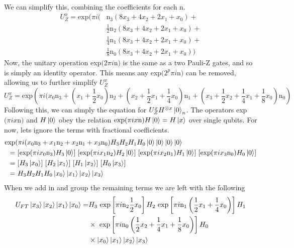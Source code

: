 \documentclass[a4paper,10pt, titlepage, twoside]{article}
\begin{document}
We can simplify this, combining the coefficients for each n.
\begin{align*}
U_Z^x = \text{exp} (\pi i (&\text{n}_3 (8x_3 + 4x_2 + 2x_1 + x_0) +\\
&\frac{1}{2}\text{n}_2 (8x_3 + 4x_2 + 2x_1 + x_0) + \\
&\frac{1}{4}\text{n}_1 (8x_3 + 4x_2 + 2x_1 + x_0) + \\
&\frac{1}{8}\text{n}_0 (8x_3 + 4x_2 + 2x_1 + x_0))
\end{align*}
Now, the unitary operation exp$(2\pi i$n$)$ is the same as a two Pauli-Z gates, and so is simply an identity operator. This means any exp$(2^p\pi i$n$)$ can be removed, allowing us to further simplify $U_Z^x$
$$U_Z^x = \text{exp} \left(\pi i (x_0\text{n}_3 + (x_1 + \frac{1}{2}x_0)\text{n}_2 + (x_2 + \frac{1}{2}x_1 + \frac{1}{4}x_0)\text{n}_1 + (x_3 + \frac{1}{2}x_2 + \frac{1}{4}x_1 + \frac{1}{8}x_0)\text{n}_0\right)$$
Following this, we can simply the equation for $U_Z ^x H^{\otimes x} \ket 0 _n$. The operators exp$(\pi i x$n$)$ and $H\ket 0$ obey the relation $\text{exp}(\pi i x \text{n}) H\ket 0 = H\ket x$ over single qubits.
For now, lets ignore the terms with fractional coefficients.
\begin{align*}
\text{exp}& (\pi i (x_0\text{n}_3 + x_1\text{n}_2 + x_2\text{n}_1 + x_3 \text{n}_0)H_3 H_2 H_1 H_0 \ket 0 \ket 0 \ket 0 \ket 0 \\
= &\text{  }[\text{exp}(\pi i x_0 \text{n}_3)H_3\ket 0 ]\text{  }[\text{exp}(\pi i x_1 \text{n}_2)H_2\ket 0 ]\text{  }[\text{exp}(\pi i x_2 \text{n}_1)H_1\ket 0 ]\text{  }[\text{exp}(\pi i x_3 \text{n}_0)H_0\ket 0 ] \\
= &\text{  }[H_3 \ket{x_0}]\text{  }[ H_2 \ket{x_1}]\text{  }[ H_1 \ket{x_2}]\text{  }[ H_0 \ket{x_3}]\\
= & \text{  }H_3 H_2 H_1 H_0 \ket{x_0} \ket{x_1} \ket{x_2} \ket{x_3}
\end{align*}
When we add in and group the remaining terms we are left with the following
\begin{align*}
U_{FT} \ket{x_3} \ket{x_2} \ket{x_1} \ket{x_0} = & H_3 \text{ exp}\left[\pi i \text{n}_2 \frac{1}{2} x_0 \right]H_2 \text{ exp}\left[\pi i \text{n}_1 \left(\frac{1}{2} x_1 + \frac{1}{4}x_0 \right) \right]H_1 \\
& \times \text{ exp}\left[\pi i \text{n}_0 \left(\frac{1}{2} x_2 + \frac{1}{4} x_1 + \frac{1}{8} x_0\right) \right]H_0\\
& \times \ket{x_0} \ket{x_1} \ket{x_2} \ket{x_3}
\end{align*}
\end{document}
